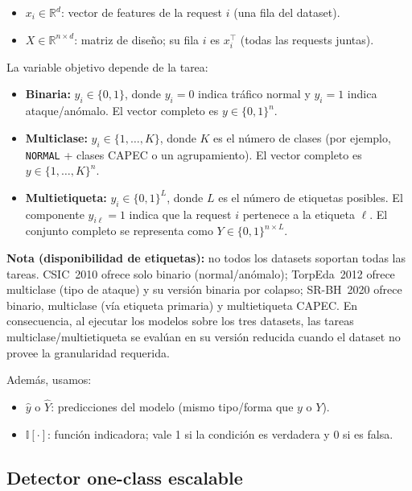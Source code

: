 \documentclass[12pt,oneside]{report}
\newcommand{\R}{\mathbb{R}}
\newcommand{\ind}{\mathbb{I}} %
\begin{document}
\begin{itemize}[leftmargin=*]
  \item $x_i \in \R^d$: vector de features de la request $i$ (una fila del dataset).
  \item $X \in \R^{n \times d}$: matriz de diseño; su fila $i$ es $x_i^\top$ (todas las requests juntas).
\end{itemize}

La variable objetivo depende de la tarea:

\begin{itemize}[leftmargin=*]
  \item \textbf{Binaria:} $y_i \in \{0,1\}$, donde $y_i=0$ indica tráfico normal y $y_i=1$ indica ataque/anómalo.
        El vector completo es $y \in \{0,1\}^n$.
  \item \textbf{Multiclase:} $y_i \in \{1,\dots,K\}$, donde $K$ es el número de clases (por ejemplo, \texttt{NORMAL} + clases CAPEC o un agrupamiento).
        El vector completo es $y \in \{1,\dots,K\}^n$.
  \item \textbf{Multietiqueta:} $y_i \in \{0,1\}^L$, donde $L$ es el número de etiquetas posibles.
        El componente $y_{i\ell}=1$ indica que la request $i$ pertenece a la etiqueta $\ell$.
        El conjunto completo se representa como $Y \in \{0,1\}^{n \times L}$.
\end{itemize}

\noindent\textbf{Nota (disponibilidad de etiquetas):} no todos los datasets soportan todas las tareas. CSIC~2010 ofrece solo binario (normal/anómalo); TorpEda~2012 ofrece multiclase (tipo de ataque) y su versión binaria por colapso; SR-BH~2020 ofrece binario, multiclase (vía etiqueta primaria) y multietiqueta CAPEC. En consecuencia, al ejecutar los modelos sobre los tres datasets, las tareas multiclase/multietiqueta se evalúan en su versión reducida cuando el dataset no provee la granularidad requerida.

Además, usamos:

\begin{itemize}[leftmargin=*]
  \item $\hat{y}$ o $\hat{Y}$: predicciones del modelo (mismo tipo/forma que $y$ o $Y$).
  \item $\ind[\cdot]$: función indicadora; vale 1 si la condición es verdadera y 0 si es falsa.
\end{itemize}

\subsection{Detector one-class escalable}
\end{document}
